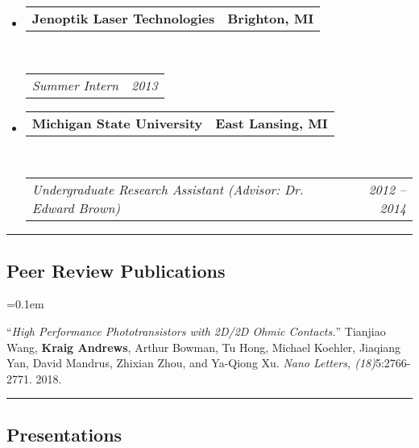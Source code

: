 \documentclass[10pt,letterpaper]{article}
\makeatletter
\newcommand{\headerrow}[2]
{\begin{tabular*}{\linewidth}{l@{\extracolsep{\fill}}r}
	#1 &
	#2 \\
\end{tabular*}}
\makeatother
\begin{document}
\begin{itemize}
	\item 
	\headerrow
		{\textbf{Jenoptik Laser Technologies}}
		{\textbf{Brighton, MI}}
	\\
	\headerrow
		{\emph{Summer Intern}}
		{\emph{2013}}

	\item 
	\headerrow
		{\textbf{Michigan State University}}
		{\textbf{East Lansing, MI}}
	\\
	\headerrow
		{\emph{Undergraduate Research Assistant  (Advisor: Dr. Edward Brown)}}
		{\emph{2012 -- 2014}}
\end{itemize}

\hrule
\vspace{-0.4em}
\subsection*{Peer Review Publications}

\begin{enumerate*}
	\parskip=0.1em
	\item ``\emph{High Performance  Phototransistors with 2D/2D Ohmic Contacts.}''
		Tianjiao Wang, \textbf{Kraig Andrews}, Arthur Bowman, Tu Hong, Michael Koehler, Jiaqiang Yan, David Mandrus, Zhixian Zhou, and Ya-Qiong Xu. \emph{Nano Letters, (18)}5:2766-2771. 2018.
\end{enumerate*}

\hrule
\vspace{-0.4em}
\subsection*{Presentations}
\end{document}
